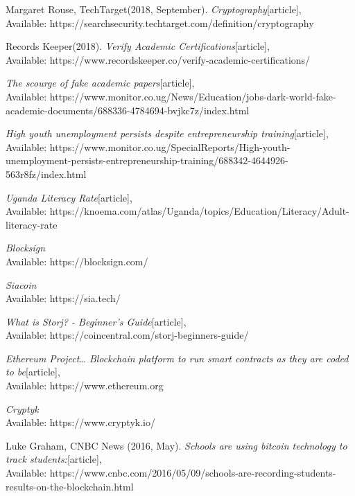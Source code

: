 \begin{thebibliography}{20}

Margaret Rouse, TechTarget(2018, September).
\emph{Cryptography}[article],\\
Available: {https://searchsecurity.techtarget.com/definition/cryptography}

 Records Keeper(2018).
\emph{Verify Academic Certifications}[article],\\
Available: {https://www.recordskeeper.co/verify-academic-certifications/}

\emph{The scourge of fake academic papers}[article],\\
Available: {https://www.monitor.co.ug/News/Education/jobs-dark-world-fake-academic-documents/688336-4784694-bvjkc7z/index.html}

\emph{High youth unemployment persists despite entrepreneurship training}[article],\\
Available: {https://www.monitor.co.ug/SpecialReports/High-youth-unemployment-persists-entrepreneurship-training/688342-4644926-563r8fz/index.html}

\emph{Uganda Literacy Rate}[article],\\
Available: {https://knoema.com/atlas/Uganda/topics/Education/Literacy/Adult-literacy-rate}

\emph{Blocksign}\\
Available: {https://blocksign.com/}

\emph{Siacoin}\\
Available: {https://sia.tech/}

\emph{What is Storj? - Beginner’s Guide}[article],\\
Available: {https://coincentral.com/storj-beginners-guide/}

\emph{Ethereum Project… Blockchain platform to run smart contracts as they are coded to be}[article],\\
Available: {https://www.ethereum.org}

\emph{Cryptyk}\\
Available: {https://www.cryptyk.io/}

Luke Graham, CNBC News (2016, May).
\emph{Schools are using bitcoin technology to track students:}[article],\\
Available: {https://www.cnbc.com/2016/05/09/schools-are-recording-students-results-on-the-blockchain.html}


\end{thebibliography}
